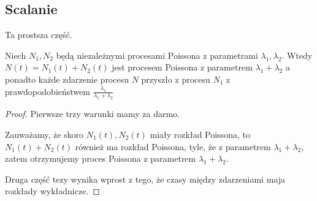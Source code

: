 \subsection{Scalanie}
Ta prostsza część.
\begin{theorem}[Twierdzenie 8.12 P\&C]
    Niech \( N_1, N_2 \) będą niezależnymi procesami Poissona z parametrami \( \lambda_1, \lambda_2 \).
    Wtedy \( N(t) = N_1(t) + N_2(t) \) jest procesem Poissona z parametrem \( \lambda_1 + \lambda_2 \)
    a ponadto każde zdarzenie procesu \( N \) przyszło z procesu \( N_1 \) z prawdopodobieństwem \( \frac{\lambda_1}{\lambda_1 + \lambda_2} \)
\end{theorem}
\begin{proof}
    Pierwsze trzy warunki mamy za darmo.
    
    Zauważamy, że skoro \( N_1(t), N_2(t) \) miały rozkład Poissona, to \( N_1(t) + N_2(t) \) również ma rozkład Poissona, tyle, że z parametrem \( \lambda_1 + \lambda_2 \), zatem otrzymujemy proces Poissona z parametrem \( \lambda_1 + \lambda_2 \).
    
    Druga część tezy wynika wprost z tego, że czasy między zdarzeniami maja rozkłady wykładnicze.
\end{proof}

